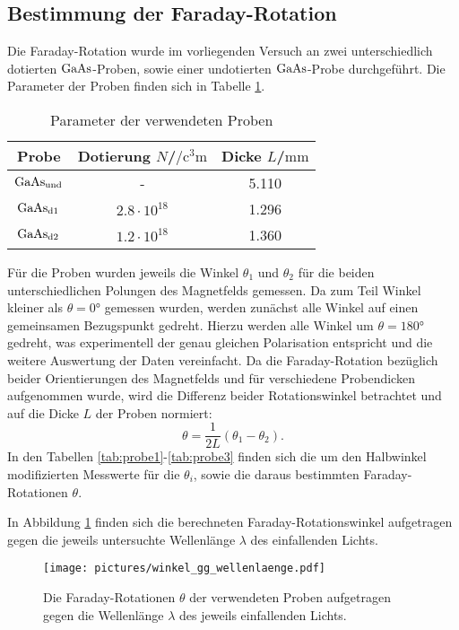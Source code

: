 \subsection{Bestimmung der Faraday-Rotation}
Die Faraday-Rotation wurde im vorliegenden Versuch an zwei unterschiedlich dotierten $\ce{GaAs}$-Proben, sowie einer undotierten $\ce{GaAs}$-Probe durchgeführt.
Die Parameter der Proben finden sich in Tabelle \ref{tab:params}.
\begin{table}
  \centering
  \caption{Parameter der verwendeten Proben}
  \label{tab:params}
  \begin{tabular}{ccc}
    \toprule
    Probe&Dotierung $N$/$\si{\per\cubic\centi\metre}$&Dicke $L$/$\si{\milli\meter}$\\
    \midrule
    $\ce{GaAs}_{\mathrm{und}}$&-&5.110\\
    $\ce{GaAs}_{\mathrm{d1}}$&$2.8\cdot 10^{18}$&1.296\\
    $\ce{GaAs}_{\mathrm{d2}}$&$1.2\cdot 10^{18}$&1.360\\
    \bottomrule
  \end{tabular}
\end{table}

Für die Proben wurden jeweils die Winkel $\theta_1$ und $\theta_2$ für die beiden unterschiedlichen Polungen des Magnetfelds gemessen. Da zum Teil Winkel kleiner als $\theta=\ang{0}$ gemessen wurden, werden zunächst  alle Winkel auf einen gemeinsamen Bezugspunkt gedreht. Hierzu werden alle Winkel um $\theta=\ang{180}$ gedreht, was experimentell der genau gleichen Polarisation entspricht und die weitere Auswertung der Daten vereinfacht.
Da die Faraday-Rotation bezüglich beider Orientierungen des Magnetfelds und für verschiedene Probendicken aufgenommen wurde, wird die Differenz beider Rotationswinkel betrachtet und auf die Dicke $L$ der Proben normiert:
\begin{equation}
  \theta=\frac{1}{2L}\left(\theta_1-\theta_2\right)\mathrm{.}
\end{equation}
In den Tabellen \ref{tab:probe1}-\ref{tab:probe3} finden sich die um den Halbwinkel modifizierten Messwerte für die $\theta_i$, sowie die daraus bestimmten Faraday-Rotationen $\theta$.




In Abbildung \ref{fig:faraday} finden sich die berechneten Faraday-Rotationswinkel aufgetragen gegen die jeweils untersuchte Wellenlänge $\lambda$ des einfallenden Lichts.

\begin{figure}
  \centering
  \texttt{[image: pictures/winkel\_gg\_wellenlaenge.pdf]}
  \caption{Die Faraday-Rotationen $\theta$ der verwendeten Proben aufgetragen gegen die Wellenlänge $\lambda$ des jeweils einfallenden Lichts.}
  \label{fig:faraday}
\end{figure}
\FloatBarrier
